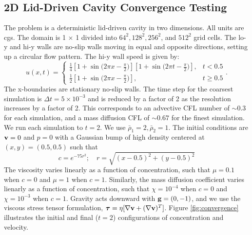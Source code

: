 \documentclass[final]{siamltex}
\def\gb {{\bf g}}
\def\vb {{\bf v}}
\def\taub   {\boldsymbol{\tau}}
\begin{document}
\subsection{2D Lid-Driven Cavity Convergence Testing}
The problem is a deterministic lid-driven cavity in two dimensions.
All units are cgs.
The domain is 1 $\times$ 1 divided into $64^2, 128^2, 256^2$, and $512^2$ grid cells.
The lo-y and hi-y walls are no-slip walls moving in equal and opposite directions,
setting up a circular flow pattern.  The hi-y wall speed is given by:
\begin{equation}
u(x,t) =
\begin{cases}
\frac{1}{4}\left[1 + \sin{(2\pi x - \frac{\pi}{2}})\right]
           \left[1 + \sin{(2\pi t - \frac{\pi}{2}})\right], & t < 0.5\\
\frac{1}{2}\left[1 + \sin{(2\pi x - \frac{\pi}{2}})\right], & t \ge 0.5
\end{cases}.
\end{equation}
The x-boundaries are stationary no-slip walls.
The time step for the coarsest simulation is $\Delta t=5\times 10^{-3}$ 
and is reduced by a factor of 2 as the resolution increases by a factor of 2.
This corresponds to an advective CFL number of $\sim 0.3$ for each simulation, and
a mass diffusion CFL of $\sim 0.67$ for the finest simulation.
We run each simulation to $t=2$.
We use $\bar\rho_1 = 2, \bar\rho_2 = 1$.
The initial conditions are $\vb=0$ and $p=0$ with
a Gaussian bump of high density centered at $(x,y) = (0.5, 0.5)$ such that
\begin{equation}
c = e^{-75r^2}; \quad r = \sqrt{(x-0.5)^2 + (y-0.5)^2}
\end{equation}
The viscosity varies linearly as a function of concentration, such that $\mu=0.1$
when $c=0$ and $\mu=1$ when $c=1$.  Similarly, the mass diffusion coefficient
varies lienarly as a function of concentration, such that $\chi=10^{-4}$ when $c=0$ and
$\chi=10^{-3}$ when $c=1$.  Gravity acts downward with $\gb=(0,-1)$, and we use
the viscous stress tensor formulation, $\taub = \eta[\nabla\vb + (\nabla\vb)^T]$.
Figure \ref{fig:convergence} illustrates the initial and final ($t=2$) configurations
of concentration and velocity.
\end{document}
